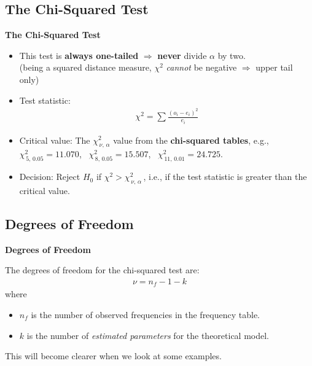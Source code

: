 \documentclass[compress]{beamer}        %
\makeatletter
\newcommand{\tcb}{\textcolor{beamer@blendedblue}}
\makeatother
\begin{document}
\subsection{The Chi-Squared Test}
\begin{frame}{\bf \tcb{The Chi-Squared Test}}

\begin{itemize}\itemsep0.9cm
\item This test is {\bf always one-tailed} $\Rightarrow$ {\bf never} divide $\alpha$ by two.\\[0.1cm]{\footnotesize(being a squared distance measure, $\chi^2$ \emph{cannot} be negative $\Rightarrow$ upper tail only)}
\item Test statistic:\\[-1.2cm]
\begin{align*}
\boxed{\chi^2 = \sum \frac{(o_i-e_i)^2}{e_i}}
\end{align*}
\item Critical value: The $\chi^2_{\,\nu,\,\alpha}$ value from the {\bf chi-squared tables}, e.g., $\chi^2_{\,5,\,0.05} = 11.070$,\,\,\, $\chi^2_{\,8,\,0.05} = 15.507$,\,\,\, $\chi^2_{\,11,\,0.01} = 24.725$.
\item Decision: Reject $H_0$ if $\chi^2 > \chi^2_{\,\nu,\,\alpha}$\,, i.e., if the test statistic is greater than the critical value.
\end{itemize}

\end{frame}


\subsection{Degrees of Freedom}
\begin{frame}{\bf \tcb{Degrees of Freedom}}

The degrees of freedom for the chi-squared test are:\\
\begin{align*}
\boxed{\nu = n_{f} - 1 - k}
\end{align*}
where\\[0.4cm]
\begin{itemize}\itemsep0.5cm
\item $n_{f}$ is the number of observed frequencies in the frequency table.
\item $k$ is the number of \emph{estimated parameters} for the theoretical model.\\[0.6cm]
\end{itemize}

This will become clearer when we look at some examples.

\end{frame}
\end{document}
